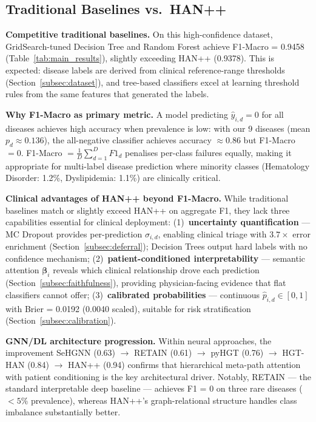 \documentclass[conference]{IEEEtran}
\begin{document}
\subsection{Traditional Baselines vs.\ HAN++}
\label{subsec:graph_necessity}

\textbf{Competitive traditional baselines.}
On this high-confidence dataset, GridSearch-tuned Decision Tree and
Random Forest achieve F1-Macro = 0.9458 (Table~\ref{tab:main_results}),
slightly exceeding HAN++ (0.9378).
This is expected: disease labels are derived from clinical
reference-range thresholds (Section~\ref{subsec:dataset}), and
tree-based classifiers excel at learning threshold rules from the same
features that generated the labels.

\textbf{Why F1-Macro as primary metric.}
A model predicting $\hat{y}_{i,d} = 0$ for all diseases achieves high
accuracy when prevalence is low: with our 9 diseases (mean
$p_d \approx 0.136$), the all-negative classifier achieves
accuracy $\approx 0.86$ but F1-Macro $= 0$.
F1-Macro $= \frac{1}{D}\sum_{d=1}^{D} F1_d$ penalises per-class
failures equally, making it appropriate for multi-label disease
prediction where minority classes (Hematology Disorder: 1.2\%,
Dyslipidemia: 1.1\%) are clinically critical.

\textbf{Clinical advantages of HAN++ beyond F1-Macro.}
While traditional baselines match or slightly exceed HAN++ on aggregate
F1, they lack three capabilities essential for clinical deployment:
(1)~\textbf{uncertainty quantification} --- MC Dropout provides
per-prediction $\sigma_{i,d}$, enabling clinical triage with
$3.7\times$ error enrichment (Section~\ref{subsec:deferral});
Decision Trees output hard labels with no confidence mechanism;
(2)~\textbf{patient-conditioned interpretability} --- semantic attention
$\boldsymbol{\beta}_i$ reveals which clinical relationship drove each
prediction (Section~\ref{subsec:faithfulness}), providing
physician-facing evidence that flat classifiers cannot offer;
(3)~\textbf{calibrated probabilities} --- continuous
$\hat{p}_{i,d} \in [0,1]$ with Brier = 0.0192 (0.0040 scaled),
suitable for risk stratification (Section~\ref{subsec:calibration}).

\textbf{GNN/DL architecture progression.}
Within neural approaches, the improvement
SeHGNN (0.63) $\to$ RETAIN (0.61) $\to$ pyHGT (0.76) $\to$
HGT-HAN (0.84) $\to$ HAN++ (0.94)
confirms that hierarchical meta-path attention with patient conditioning
is the key architectural driver.
Notably, RETAIN --- the standard interpretable deep baseline --- achieves
F1 = 0 on three rare diseases ($< 5\%$ prevalence), whereas HAN++'s
graph-relational structure handles class imbalance substantially better.
\end{document}
